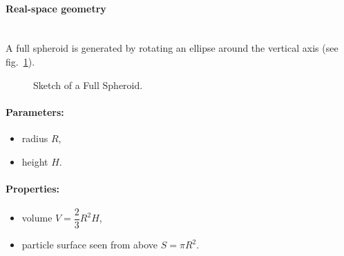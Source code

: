 \paragraph{Real-space geometry}\mbox{}\\
A full spheroid is generated by rotating an ellipse around the vertical
axis (see fig.~\ref{fig:fullspheroid}).

\begin{figure}[ht]
\hfill
{}
\hfill
{}
\hfill
\caption{Sketch of a Full Spheroid. }
\label{fig:fullspheroid}
\end{figure}

\FloatBarrier

\paragraph{Parameters:}
\begin{itemize}
\item radius $R$,
\item height $H$.
\end{itemize}

\paragraph{Properties:}
\begin{itemize}
\item volume $V =\dfrac{2}{3}R^2H$,
\item particle surface seen from above $S =\pi R^2$. 
\end{itemize}

